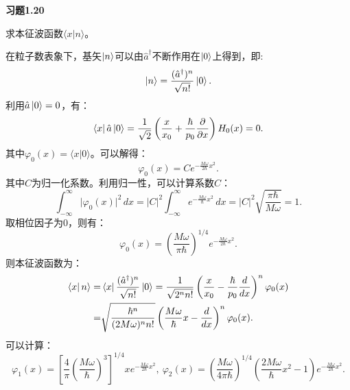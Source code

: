 \documentclass[reqno,a4paper,12pt]{amsart}
\begin{document}
\textbf{习题1.20}

求本征波函数$\langle x \vert n \rangle$。
\begin{tcolorbox}[breakable, colback = black!5!white, colframe = black]
在粒子数表象下，基矢$\ket{n}$可以由$\hat{a}^\dagger$不断作用在$\ket{0}$上得到，即:
\[
	\ket{n} = \frac{(\hat{a}^\dagger)^n}{\sqrt{n!}} \ket{0}.
\]
利用$\hat{a}\ket{0} = 0$，有：
\[
	\bra{x} \hat{a} \ket{0} = \frac{1}{\sqrt{2}}\left( \frac{x}{x_0}+\frac{\hbar}{p_0} \frac{\partial}{\partial x} \right) H_0(x) = 0.
\]
其中$\varphi_0(x) = \langle x \vert 0 \rangle$。可以解得：
\[
	\varphi_0(x) = Ce^{-\frac{M\omega}{2\hbar}x^2}.
\]
其中$C$为归一化系数。利用归一性，可以计算系数$C$：
\[
	\int_{-\infty}^\infty \vert \varphi_0(x) \vert^2 \,dx = \vert C \vert^2 \int_{-\infty}^\infty e^{-\frac{M\omega}{\hbar}x^2}\,dx = \vert C \vert^2 \sqrt{\frac{\pi\hbar}{M\omega}} = 1.
\]
取相位因子为$0$，则有：
\[
	\varphi_0(x) = \left( \frac{M\omega}{\pi\hbar} \right)^{1/4} e^{-\frac{M\omega}{2\hbar}x^2}.
\]
则本征波函数为：
\begin{align*}
	\bra{x} n \rangle =& \bra{x} \frac{(\hat{a}^\dagger)^n}{\sqrt{n!}} \ket{0} = \frac{1}{\sqrt{2^nn!}} \left( \frac{x}{x_0}-\frac{\hbar}{p_0} \frac{d}{d x} \right)^n \varphi_0(x) \\
	=& \sqrt{\frac{\hbar^n}{(2M\omega)^nn!}} \left( \frac{M\omega}{\hbar} x - \frac{d}{d x} \right)^n \varphi_0(x).
\end{align*}
可以计算：
\[
	\varphi_1(x) = \left[ \frac{4}{\pi}\left(\frac{M\omega}{\hbar}\right)^3 \right]^{1/4} xe^{-\frac{M\omega}{2\hbar} x^2},~ \varphi_2(x) = \left( \frac{M\omega}{4\pi\hbar} \right)^{1/4} \left( \frac{2M\omega}{\hbar}x^2 - 1 \right) e^{-\frac{M\omega}{2\hbar}x^2}.
\]
\end{tcolorbox}
\end{document}
